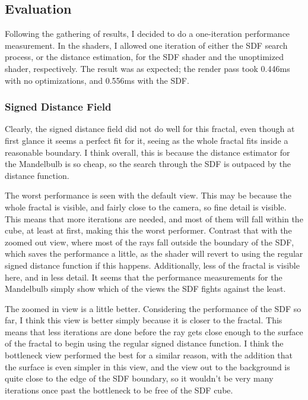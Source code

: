 \subsection{Evaluation}

Following the gathering of results, I decided to do a one-iteration performance measurement. In the shaders, I allowed one iteration of either the SDF search process, or the distance estimation, for the SDF shader and the unoptimized shader, respectively. The result was as expected; the render pass took 0.446ms with no optimizations, and 0.556ms with the SDF.

\subsubsection{Signed Distance Field}

Clearly, the signed distance field did not do well for this fractal, even though at first glance it seems a perfect fit for it, seeing as the whole fractal fits inside a reasonable boundary. I think overall, this is because the distance estimator for the Mandelbulb is so cheap, so the search through the SDF is outpaced by the distance function.\newline

The worst performance is seen with the default view. This may be because the whole fractal is visible, and fairly close to the camera, so fine detail is visible. This means that more iterations are needed, and most of them will fall within the cube, at least at first, making this the worst performer. Contrast that with the zoomed out view, where most of the rays fall outside the boundary of the SDF, which saves the performance a little, as the shader will revert to using the regular signed distance function if this happens. Additionally, less of the fractal is visible here, and in less detail. It seems that the performance measurements for the Mandelbulb simply show which of the views the SDF fights against the least.\newline

The zoomed in view is a little better. Considering the performance of the SDF so far, I think this view is better simply because it is closer to the fractal. This means that less iterations are done before the ray gets close enough to the surface of the fractal to begin using the regular signed distance function. I think the bottleneck view performed the best for a similar reason, with the addition that the surface is even simpler in this view, and the view out to the background is quite close to the edge of the SDF boundary, so it wouldn't be very many iterations once past the bottleneck to be free of the SDF cube.\newline

